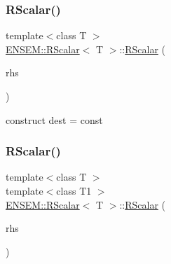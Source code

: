 \mbox{\label{classENSEM_1_1RScalar_a49babd15684b91b796da264d2aa2681f}} 
\subsubsection{\texorpdfstring{RScalar()}{RScalar()}\hspace{0.1cm}{\footnotesize\ttfamily [2/10]}}
{\footnotesize\ttfamily template$<$class T $>$ \\
\mbox{\hyperlink{classENSEM_1_1RScalar}{E\+N\+S\+E\+M\+::\+R\+Scalar}}$<$ T $>$\+::\mbox{\hyperlink{classENSEM_1_1RScalar}{R\+Scalar}} (\begin{DoxyParamCaption}\item[{const typename \mbox{\hyperlink{structENSEM_1_1WordType}{Word\+Type}}$<$ T $>$\+::Type\+\_\+t \&}]{rhs }\end{DoxyParamCaption})\hspace{0.3cm}{\ttfamily [inline]}}



construct dest = const 

\mbox{\label{classENSEM_1_1RScalar_a93e56021a00d35af008ae72de2eb60f2}} 
\subsubsection{\texorpdfstring{RScalar()}{RScalar()}\hspace{0.1cm}{\footnotesize\ttfamily [3/10]}}
{\footnotesize\ttfamily template$<$class T $>$ \\
template$<$class T1 $>$ \\
\mbox{\hyperlink{classENSEM_1_1RScalar}{E\+N\+S\+E\+M\+::\+R\+Scalar}}$<$ T $>$\+::\mbox{\hyperlink{classENSEM_1_1RScalar}{R\+Scalar}} (\begin{DoxyParamCaption}\item[{const \mbox{\hyperlink{classENSEM_1_1RScalar}{R\+Scalar}}$<$ T1 $>$ \&}]{rhs }\end{DoxyParamCaption})\hspace{0.3cm}{\ttfamily [inline]}}



